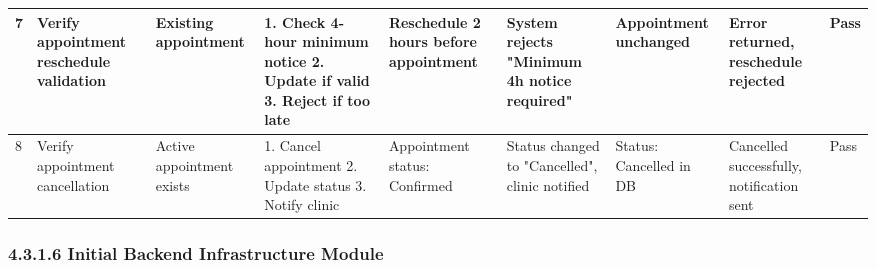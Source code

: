 \begin{table}[H]
\begin{tabular}{|p{0.4cm}|p{2cm}|p{1.2cm}|p{2cm}|p{2cm}|p{2cm}|p{1.5cm}|p{2cm}|p{0.7cm}|}
7 & Verify appointment reschedule validation & Existing appointment & 1. Check 4-hour minimum notice 2. Update if valid 3. Reject if too late & Reschedule 2 hours before appointment & System rejects "Minimum 4h notice required" & Appointment unchanged & Error returned, reschedule rejected & Pass \\ \hline
8 & Verify appointment cancellation & Active appointment exists & 1. Cancel appointment 2. Update status 3. Notify clinic & Appointment status: Confirmed & Status changed to "Cancelled", clinic notified & Status: Cancelled in DB & Cancelled successfully, notification sent & Pass \\ \hline
\end{tabular}
\label{tab:vet_tests}
\end{table}

\subsubsection{4.3.1.6 Initial Backend Infrastructure Module}

